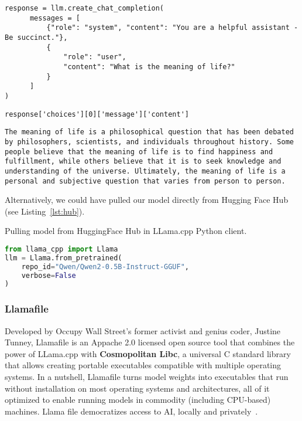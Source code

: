 \begin{verbatim}
response = llm.create_chat_completion(
      messages = [
          {"role": "system", "content": "You are a helpful assistant - Be succinct."},
          {
              "role": "user",
              "content": "What is the meaning of life?"
          }
      ]
)
\end{verbatim}

\begin{verbatim}
response['choices'][0]['message']['content']
\end{verbatim}

\begin{verbatim}
The meaning of life is a philosophical question that has been debated by philosophers, scientists, and individuals throughout history. Some people believe that the meaning of life is to find happiness and fulfillment, while others believe that it is to seek knowledge and understanding of the universe. Ultimately, the meaning of life is a personal and subjective question that varies from person to person.
\end{verbatim}

Alternatively, we could have pulled our model directly from Hugging Face Hub (see Listing~\ref{lst:hub}).

\begin{marginlisting}[-1.35cm]
	\caption{Pulling model from HuggingFace Hub in LLama.cpp Python client.}
    \label{lst:hub}
	\vspace{0.6cm}
	\begin{lstlisting}[language=Python,style=kaolstplain]
from llama_cpp import Llama
llm = Llama.from_pretrained(
    repo_id="Qwen/Qwen2-0.5B-Instruct-GGUF",
    verbose=False
)
	\end{lstlisting}
\end{marginlisting}


\subsubsection{Llamafile}

Developed by Occupy Wall Street's former activist and genius coder, Justine Tunney, Llamafile  is an Appache 2.0 licensed open source tool that combines the power of LLama.cpp with \textbf{Cosmopolitan Libc}, a universal C standard library that allows creating portable executables compatible with multiple operating systems. In a nutshell, Llamafile turns model weights into executables that run without installation on most operating systems and architectures, all of it optimized to enable running models in commodity (including CPU-based) machines. Llama file democratizes access to AI, locally and privately~.

